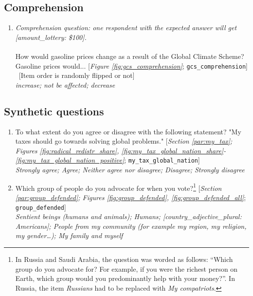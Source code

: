  \subsection*{Comprehension} 
 \begin{enumerate}[resume] 
\item  \label{q:gcs_comprehension} \textit{Comprehension question: one respondent with the expected answer will get [amount\_lottery: \$100].}\\\\How would gasoline prices change as a result of the Global Climate Scheme? \\Gasoline prices would... [\textit{Figure \ref{fig:gcs_comprehension}}; 
\verb|gcs_comprehension|]
~[Item order is randomly flipped or not]
  \\ \textit{increase; not be affected; decrease}

\end{enumerate} 

 \subsection*{Synthetic questions} 
 \begin{enumerate}[resume] 
\item  \label{q:my_tax_global_nation} To what extent do you agree or disagree with the following statement? "My taxes should go towards solving global problems." [\textit{Section \ref{par:my_tax}; Figures \ref{fig:radical_redistr_share}, \ref{fig:my_tax_global_nation_share}-\ref{fig:my_tax_global_nation_positive}}; 
\verb|my_tax_global_nation|]
  \\ \textit{Strongly agree; Agree; Neither agree nor disagree; Disagree; Strongly disagree}

\item  \label{q:group_defended} Which group of people do you advocate for when you vote?\footnote{In Russia and Saudi Arabia, the question was worded as follows: ``Which group do you advocate for? For example, if you were the richest person on Earth, which group would you predominantly help with your money?''. In Russia, the item \textit{Russians} had to be replaced with \textit{My compatriots}.} [\textit{Section \ref{par:group_defended}; Figures \ref{fig:group_defended}, \ref{fig:group_defended_all}}; 
\verb|group_defended|] 
  \\ \textit{Sentient beings (humans and animals); Humans; [country\_adjective\_plural: Americans]; People from my community (for example my region, my religion, my gender…); My family and myself}

\end{enumerate} 

